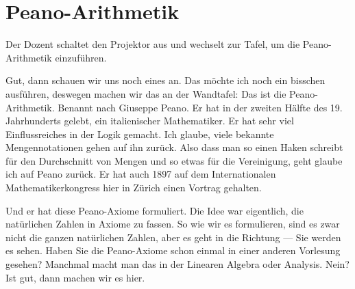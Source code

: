 \begin{math-stroke}
\end{math-stroke}

\section{Peano-Arithmetik}

\begin{meta-note}[Tafelübergang]
Der Dozent schaltet den Projektor aus und wechselt zur Tafel, um die Peano-Arithmetik einzuführen.
\end{meta-note}

\begin{spoken-clean}[00:04:20 - 00:06:29]
Gut, dann schauen wir uns noch eines an. Das möchte ich noch ein bisschen ausführen, deswegen machen wir das an der Wandtafel: Das ist die Peano-Arithmetik. Benannt nach Giuseppe Peano. Er hat in der zweiten Hälfte des 19. Jahrhunderts gelebt, ein italienischer Mathematiker. Er hat sehr viel Einflussreiches in der Logik gemacht. Ich glaube, viele bekannte Mengennotationen gehen auf ihn zurück. Also dass man so einen Haken schreibt für den Durchschnitt von Mengen und so etwas für die Vereinigung, geht glaube ich auf Peano zurück. Er hat auch 1897 auf dem Internationalen Mathematikerkongress hier in Zürich einen Vortrag gehalten.

Und er hat diese Peano-Axiome formuliert. Die Idee war eigentlich, die natürlichen Zahlen in Axiome zu fassen. So wie wir es formulieren, sind es zwar nicht die ganzen natürlichen Zahlen, aber es geht in die Richtung --- Sie werden es sehen. Haben Sie die Peano-Axiome schon einmal in einer anderen Vorlesung gesehen? Manchmal macht man das in der Linearen Algebra oder Analysis. Nein? Ist gut, dann machen wir es hier.
\end{spoken-clean}

